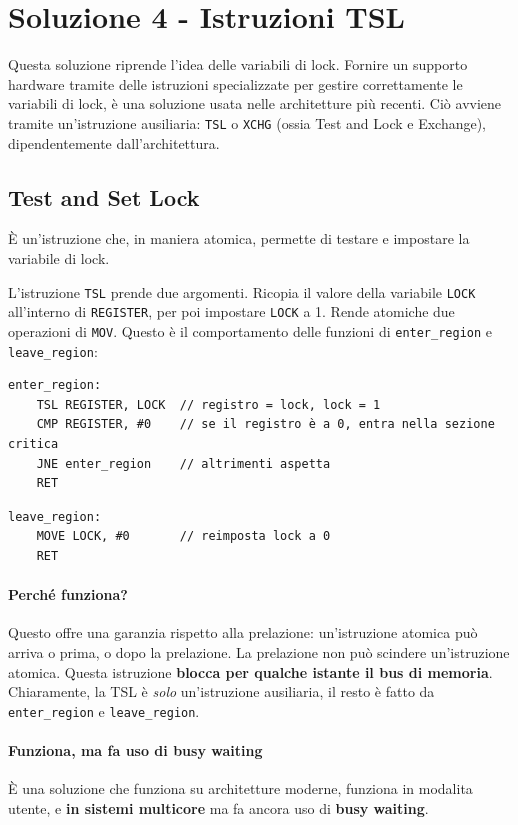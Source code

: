\documentclass{report}
\begin{document}
\newpage

\section{Soluzione 4 - Istruzioni TSL}
Questa soluzione riprende l'idea delle variabili di lock.
Fornire un supporto hardware tramite delle istruzioni specializzate per gestire correttamente le variabili di lock, è una soluzione usata nelle architetture più recenti.
Ciò avviene tramite un'istruzione ausiliaria: \verb|TSL| o \verb|XCHG| (ossia Test and Lock e Exchange), dipendentemente dall'architettura.

\subsection{Test and Set Lock}
È un'istruzione che, in maniera atomica, permette di testare e impostare la variabile di lock.

L'istruzione \verb|TSL| prende due argomenti. Ricopia il valore della variabile \verb|LOCK| all'interno di \verb|REGISTER|, per poi impostare \verb|LOCK| a 1. Rende atomiche due operazioni di \verb|MOV|. Questo è il comportamento delle funzioni di \verb*|enter_region| e \verb*|leave_region|:

\begin{verbatim}
enter_region:
    TSL REGISTER, LOCK  // registro = lock, lock = 1
    CMP REGISTER, #0    // se il registro è a 0, entra nella sezione critica 
    JNE enter_region    // altrimenti aspetta
    RET
\end{verbatim}

\begin{verbatim}
leave_region:
    MOVE LOCK, #0       // reimposta lock a 0
    RET
\end{verbatim}

\paragraph{Perché funziona?}
Questo offre una garanzia rispetto alla prelazione: un'istruzione atomica può arriva o prima, o dopo la prelazione. La prelazione non può scindere un'istruzione atomica. Questa istruzione \textbf{blocca per qualche istante il bus di memoria}. Chiaramente, la TSL è \textit{solo} un'istruzione ausiliaria, il resto è fatto da \verb*|enter_region| e \verb*|leave_region|.

\paragraph{Funziona, ma fa uso di busy waiting}
È una soluzione che funziona su architetture moderne, funziona in modalita utente, e \textbf{in sistemi multicore} ma fa ancora uso di \textbf{busy waiting}.
\end{document}
